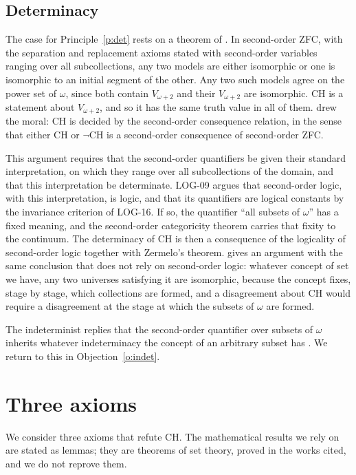 \documentclass{situationist-preprint}
\begin{document}
\subsection{Determinacy}\label{s:determinacy}

The case for Principle~\ref{p:det} rests on a theorem of \citet{Zermelo1930}. In second-order ZFC, with the separation and replacement axioms stated with second-order variables ranging over all subcollections, any two models are either isomorphic or one is isomorphic to an initial segment of the other. Any two such models agree on the power set of $\omega$, since both contain $V_{\omega+2}$ and their $V_{\omega+2}$ are isomorphic. CH is a statement about $V_{\omega+2}$, and so it has the same truth value in all of them. \citet{Kreisel1967} drew the moral: CH is decided by the second-order consequence relation, in the sense that either CH or $\neg$CH is a second-order consequence of second-order ZFC.

This argument requires that the second-order quantifiers be given their standard interpretation, on which they range over all subcollections of the domain, and that this interpretation be determinate. LOG-09 argues that second-order logic, with this interpretation, is logic, and that its quantifiers are logical constants by the invariance criterion of LOG-16. If so, the quantifier \enquote{all subsets of $\omega$} has a fixed meaning, and the second-order categoricity theorem carries that fixity to the continuum. The determinacy of CH is then a consequence of the logicality of second-order logic together with Zermelo's theorem. \citet{Martin2001} gives an argument with the same conclusion that does not rely on second-order logic: whatever concept of set we have, any two universes satisfying it are isomorphic, because the concept fixes, stage by stage, which collections are formed, and a disagreement about CH would require a disagreement at the stage at which the subsets of $\omega$ are formed.

The indeterminist replies that the second-order quantifier over subsets of $\omega$ inherits whatever indeterminacy the concept of an arbitrary subset has \citep{Feferman1999}. We return to this in Objection~\ref{o:indet}.

\section{Three axioms}\label{s:axioms}

We consider three axioms that refute CH. The mathematical results we rely on are stated as lemmas; they are theorems of set theory, proved in the works cited, and we do not reprove them.
\end{document}
